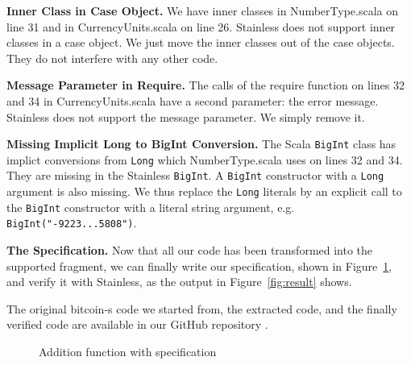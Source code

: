 \documentclass[runningheads]{llncs}
\renewcommand{\paragraph}{\textbf}%
\begin{document}
\paragraph{Inner Class in Case Object.} We have inner classes in
NumberType.scala on line 31 and in CurrencyUnits.scala on line
26. Stainless does not support inner classes in a case object. We just
move the inner classes out of the case objects. They do not interfere
with any other code.

\paragraph{Message Parameter in Require.} The calls of the require
function on lines 32 and 34 in CurrencyUnits.scala have a second
parameter: the error message. Stainless does not support the message
parameter. We simply remove it.

\paragraph{Missing Implicit Long to BigInt Conversion.} The Scala
\texttt{BigInt} class has implict conversions from \texttt{Long} which
NumberType.scala uses on lines 32 and 34. They are missing in the
Stainless \texttt{BigInt}. A \texttt{BigInt} constructor with a
\texttt{Long} argument is also missing. We thus replace the
\texttt{Long} literals by an explicit call to the \texttt{BigInt}
constructor with a literal string argument,
e.g. \texttt{BigInt("-9223...5808")}.


\paragraph{The Specification.} Now that all our code has been
transformed into the supported fragment, we can finally write our
specification, shown in Figure~\ref{fig:spec}, and verify it with
Stainless, as the output in Figure~\ref{fig:result} shows.

The original bitcoin-s code we started from, the extracted code, and
the finally verified code are available in our GitHub repository \cite{verification:github}.

\begin{figure}

\caption{Addition function with specification}
\label{fig:spec}
\end{figure}
\end{document}
